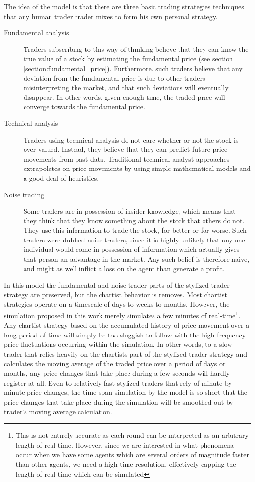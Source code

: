 The idea of the model is that there are three basic trading strategies techniques that any human trader trader mixes to form his own personal strategy. 
\begin{description}
\item[Fundamental analysis] Traders subscribing to this way of thinking believe that they can know the true value of a stock by estimating the fundamental price (see section \ref{section:fundamental_price}). Furthermore, such traders believe that any deviation from the fundamental price is due to other traders misinterpreting the market, and that such deviations will eventually disappear. In other words, given enough time, the traded price will converge towards the fundamental price. 
\item[Technical analysis] Traders using technical analysis do not care whether or not the stock is over valued. Instead, they believe that they can predict future price movements from past data. Traditional technical analyst approaches extrapolates on price movements by using simple mathematical models and a good deal of heuristics.
\item[Noise trading] Some traders are in possession of insider knowledge, which means that they think that they know something about the stock that others do not. They use this information to trade the stock, for better or for worse. Such traders were dubbed noise traders, since it is highly unlikely that any one individual would come in possession of information which actually gives that person an advantage in the market. Any such belief is therefore naive, and might as well inflict a loss on the agent than generate a profit.
\end{description}

 
In this model the fundamental and noise trader parts of the stylized trader strategy are preserved, but the chartist behavior is removes. Most chartist strategies operate on a timescale of days to weeks to months. However, the simulation proposed in this work merely simulates a few minutes of real-time\footnote{This is not entirely accurate as each round can be interpreted as an arbitrary length of real-time. However, since we are interested in what phenomena occur when we have some agents which are several orders of magnitude faster than other agents, we need a high time resolution, effectively capping the length of real-time which can be simulated}. Any chartist strategy based on the accumulated history of price movement over a long period of time will simply be too sluggish to follow with the high frequency price fluctuations occurring within the simulation. In other words, to a slow trader that relies heavily on the chartists part of the stylized trader strategy and calculates the moving average of the traded price over a period of days or months, any price changes that take place during a few seconds will hardly register at all. Even to relatively fast stylized traders that rely of minute-by-minute price changes, the time span simulation by the model is so short that the price changes that take place during the simulation will be smoothed out by trader's moving average calculation. 

